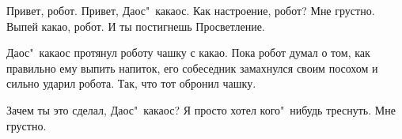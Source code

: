 \begin{dialog}
\X Привет, робот.
\R Привет, Даос"~какаос.
\X Как настроение, робот?
\R Мне грустно.
\X Выпей какао, робот. И ты постигнешь Просветление.
\end{dialog}

\begin{monolog}
Даос"~какаос протянул роботу чашку с какао. Пока робот думал о том, как правильно ему выпить напиток, его собеседник замахнулся своим посохом и сильно ударил робота. Так, что тот обронил чашку.
\end{monolog}

\begin{dialog}
\X Зачем ты это сделал, Даос"~какаос?
\R Я просто хотел кого"~нибудь треснуть.
\X Мне грустно.
\end{dialog}